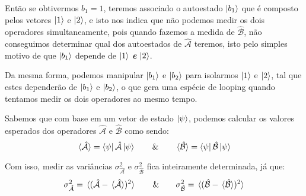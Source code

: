     Então se obtivermos $b_{1}=1$, teremos associado o autoestado $\ket{b_{1}}$ que é composto pelos vetores $\ket{1}$ e $\ket{2}$, e isto nos indica que não podemos medir os dois operadores simultaneamente, pois quando fazemos a medida de $\hat{\mathcal{B}}$, não conseguimos determinar qual dos autoestados de $\hat{\mathcal{A}}$ teremos, isto pelo simples motivo de que $\ket{b_{1}}$ depende de $\ket{1}$ \textit{\textbf{e}} $\ket{2}$. 
    
    Da mesma forma, podemos manipular $\ket{b_{1}}$ e $\ket{b_{2}}$ para isolarmos $\ket{1}$ e $\ket{2}$, tal que estes dependerão de $\ket{b_{1}}$ e $\ket{b_{2}}$, o que gera uma espécie de looping quando tentamos medir os dois operadores ao mesmo tempo.
    
    Sabemos que com base em um vetor de estado $\ket{\psi}$, podemos calcular os valores esperados dos operadores $\hat{\mathcal{A}}$ e $\hat{\mathcal{B}}$ como sendo:
        \begin{equation*}
            \expval*{\hat{\mathcal{A}}} = \bra{\psi}\hat{\mathcal{A}}\ket{\psi} \qquad \& \qquad
            \expval*{\hat{\mathcal{B}}} = \bra{\psi}\hat{\mathcal{B}}\ket{\psi}
        \end{equation*}
    
    Com isso, medir as variâncias $\sigma_{\hat{\mathcal{A}}}^2$ e $\sigma_{\hat{\mathcal{B}}}^{2}$ fica inteiramente determinada, já que:
        \begin{equation*}
            \sigma_{\hat{\mathcal{A}}}^2 = \expval*{(\hat{\mathcal{A}} - \expval*{\hat{\mathcal{A}}})^2} \qquad \& \qquad 
            \sigma_{\hat{\mathcal{B}}}^2 = \expval*{(\hat{\mathcal{B}} - \expval*{\hat{\mathcal{B}}})^2}
        \end{equation*}
    
